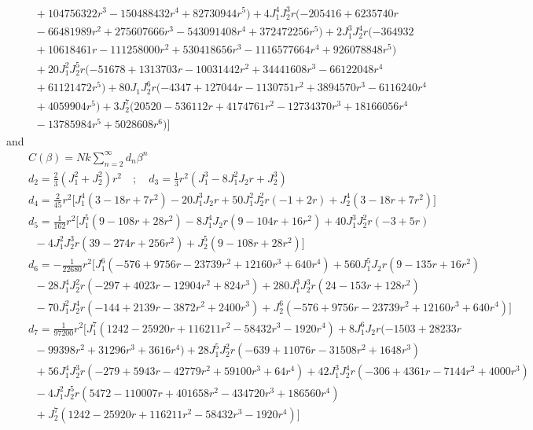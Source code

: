 \documentclass[aps,twocolumn,groupedaddress]{revtex4}
\begin{document}
\begin{widetext}
\begin{eqnarray}
&&\; \; +104756322r^3-150488432r^4+82730944r^5)+4J_1^4J_2^3r(-205416+6235740r\nonumber\\
&&\; \; -66481989r^2+275607666r^3-543091408r^4+372472256r^5)+2J_1^3J_2^4r(-364932\nonumber\\
&&\; \; +10618461r-111258000r^2+530418656r^3-1116577664r^4+926078848r^5)\nonumber\\
&&\; \; +20J_1^2J_2^5r(-51678+1313703r-10031442r^2+34441608r^3-66122048r^4\nonumber\\
&&\; \; +61121472r^5)+80J_1J_2^6r(-4347+127044r-1130751r^2+3894570r^3-6116240r^4\nonumber\\
&&\; \; +4059904r^5)+3J_2^7(20520-536112r+4174761r^2-12734370r^3+18166056r^4\nonumber\\
&&\; \; -13785984r^5+5028608r^6)\Big]\nonumber
\end{eqnarray}
and
\begin{eqnarray} \label{HTE_j1j2_C}
&&C(\beta)=Nk\sum_{n=2}^\infty d_n\beta^n \\
&& d_2=\frac{2}{3}(J_1^2+J_2^2)r^2 \quad ; \quad d_3=\frac{1}{3}r^2(J_1^3-8J_1^2J_2r+J_2^3)\nonumber\\
&& d_4=\frac{2}{45}r^2\Big[J_1^4(3-18r+7r^2)-20J_1^3J_2r+50J_1^2J_2^2r(-1+2r)+J_2^4(3-18r+7 r^2)\Big]\nonumber\\
&& d_5=\frac{1}{162}r^2\Big[J_1^5(9-108r+28r^2)-8J_1^4J_2r(9-104r+16r^2)+40J_1^3J_2^2r(-3+5r)\nonumber\\
&& \; \; -4J_1^2J_2^3r(39-274r+256r^2)+J_2^5(9-108r+28r^2)\Big]\nonumber\\
&&d_6=-\frac{1}{22680}r^2\Big[J_1^6(-576+9756r-23739r^2+12160r^3+640r^4)+560J_1^5J_2r(9-135r+16r^2)\nonumber\\
&& \; \; -28J_1^4J_2^2r(-297+4023r-12904r^2+824r^3)+280J_1^3J_2^3r(24-153r+128r^2)\nonumber\\
&& \; \; -70J_1^2J_2^4r(-144+2139r-3872r^2+2400r^3)+J_2^6(-576+9756r-23739r^2+12160r^3+640r^4)\Big]\nonumber\\
&& d_7=\frac{1}{97200}r^2\Big[J_1^7(1242-25920r+116211r^2-58432r^3-1920r^4)+8J_1^6J_2r(-1503
 +28233r\nonumber\\
&& \; \;-99398r^2+31296r^3+3616r^4)+28J_1^5J_2^2r(-639+11076r-31508r^2 +1648r^3)\nonumber\\
&& \;\;+56J_1^4J_2^3r(-279+5943r-42779r^2+59100r^3+64r^4)+42J_1^3J_2^4r(-306+4361r-7144r^2+4000r^3)\nonumber\\
&& \; \; -4J_1^2J_2^5r(5472-110007r+401658r^2-434720r^3 +186560r^4)\nonumber\\
&& \; \;+J_2^7(1242-25920r+116211r^2-58432r^3-1920r^4)\Big]\nonumber\\

\end{eqnarray}
\end{widetext}
\end{document}
